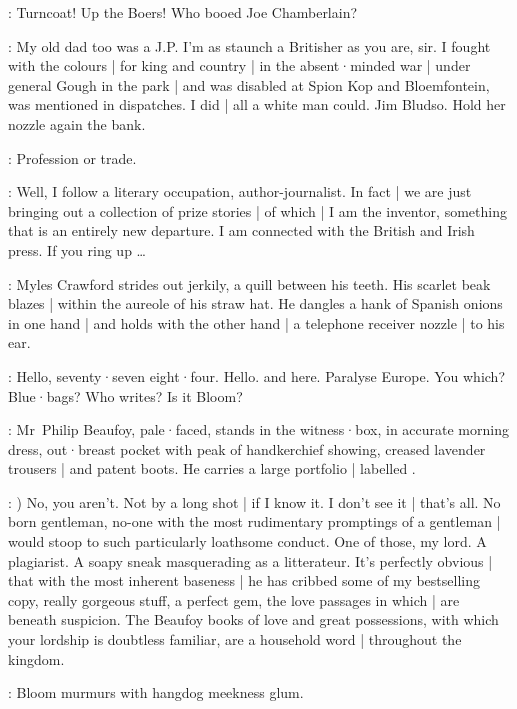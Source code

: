 \Voice:
Turncoat!
Up the Boers!
Who booed Joe Chamberlain?

\Bloom:
My old dad too was a J.P.
I'm as staunch a Britisher as you are,
sir.
I fought with the colours |
for king and country |
in the absent·minded war |
under general Gough in the park |
and was disabled at Spion Kop and Bloemfontein,
was mentioned in dispatches.
I did |
all a white man could.
Jim Bludso.
Hold her nozzle again the bank.

\FirstWatch:
Profession or trade.

\Bloom:
Well,
I follow a literary occupation,
author-journalist.
In fact |
we are just bringing out a collection of prize stories |
of which |
I am the inventor,
something that is an entirely new departure.
I am connected with the British and Irish press.
If you ring up \ldots

:
Myles Crawford strides out jerkily,
a quill between his teeth.
His scarlet beak blazes |
within the aureole of his straw hat.
He dangles a hank of Spanish onions in one hand |
and holds with the other hand |
a telephone receiver nozzle |
to his ear.

\Myles:
Hello,
seventy·seven eight·four.
Hello.
and 
here.
Paralyse Europe.
You which?
Blue·bags?
Who writes?
Is it Bloom?

:
Mr~Philip Beaufoy,
pale·faced,
stands in the witness·box,
in accurate morning dress,
out·breast pocket with peak of handkerchief showing,
creased lavender trousers |
and patent boots.
He carries a large portfolio |
labelled .

\Beaufoy:
)
No,
you aren't.
Not by a long shot |
if I know it.
I don't see it |
that's all.
No born gentleman,
no-one with the most rudimentary promptings of a gentleman |
would stoop to such particularly loathsome conduct.
One of those,
my lord.
A plagiarist.
A soapy sneak masquerading as a litterateur.
It's perfectly obvious |
that with the most inherent baseness |
he has cribbed some of my bestselling copy,
really gorgeous stuff,
a perfect gem,
the love passages in which |
are beneath suspicion.
The Beaufoy books of love and great possessions,
with which your lordship is doubtless familiar,
are a household word |
throughout the kingdom.

:
Bloom murmurs with hangdog meekness glum.

